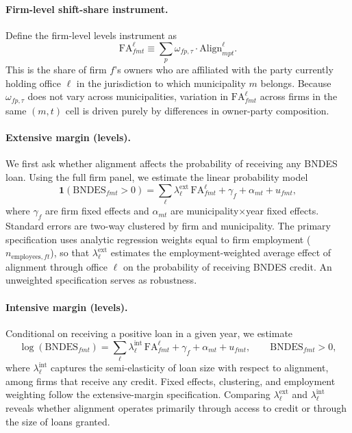 \documentclass{article}
\newcommand{\Align}{\mathrm{Align}}
\newcommand{\FA}{\mathrm{FA}}
\begin{document}
\paragraph{Firm-level shift-share instrument.}
Define the firm-level levels instrument as
\[
  \FA^{\ell}_{fmt} \equiv \sum_{p} \omega_{fp,\tau} \cdot \Align^{\ell}_{mpt}.
\]
This is the share of firm $f$'s owners who are affiliated with the party currently
holding office $\ell$ in the jurisdiction to which municipality $m$ belongs.
Because $\omega_{fp,\tau}$ does not vary across municipalities,
variation in $\FA^{\ell}_{fmt}$ across firms in the same $(m,t)$ cell
is driven purely by differences in owner-party composition.

\paragraph{Extensive margin (levels).}
We first ask whether alignment affects the probability of receiving any BNDES loan.
Using the full firm panel, we estimate the linear probability model
\[
  \mathbf{1}(\text{BNDES}_{fmt} > 0) = \sum_{\ell} \lambda^{\text{ext}}_{\ell}\, \FA^{\ell}_{fmt}
  + \gamma_{f} + \alpha_{mt} + u_{fmt},
\]
where $\gamma_f$ are firm fixed effects
and $\alpha_{mt}$ are municipality$\times$year fixed effects.
Standard errors are two-way clustered by firm and municipality.
The primary specification uses analytic regression weights equal to firm employment
($n_{\text{employees},ft}$), so that $\lambda^{\text{ext}}_\ell$ estimates the
employment-weighted average effect of alignment through office $\ell$
on the probability of receiving BNDES credit.
An unweighted specification serves as robustness.

\paragraph{Intensive margin (levels).}
Conditional on receiving a positive loan in a given year, we estimate
\[
  \log(\text{BNDES}_{fmt}) = \sum_{\ell} \lambda^{\text{int}}_{\ell}\, \FA^{\ell}_{fmt}
  + \gamma_{f} + \alpha_{mt} + u_{fmt},
  \qquad \text{BNDES}_{fmt} > 0,
\]
where $\lambda^{\text{int}}_\ell$ captures the semi-elasticity of loan size
with respect to alignment, among firms that receive any credit.
Fixed effects, clustering, and employment weighting follow the extensive-margin specification.
Comparing $\lambda^{\text{ext}}_\ell$ and $\lambda^{\text{int}}_\ell$ reveals
whether alignment operates primarily through access to credit or through the size of loans granted.
\end{document}
